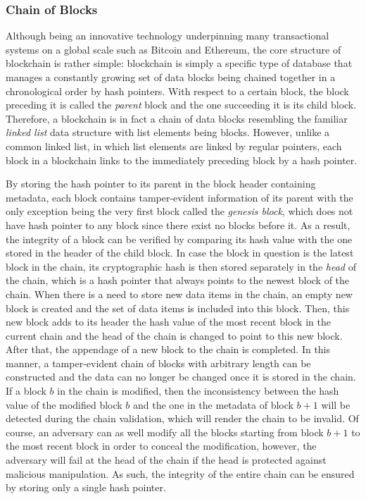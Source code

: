 \subsubsection{Chain of Blocks}\label{sec_chain_of_blocks}

Although being an innovative technology underpinning many transactional systems on a global scale such as Bitcoin and Ethereum, the core structure of blockchain is rather simple: blockchain is simply a specific type of database that manages a constantly growing set of data blocks being chained together in a chronological order by hash pointers. With respect to a certain block, the block preceding it is called the \textit{parent} block and the one succeeding it is its child block. Therefore, a blockchain is in fact a chain of data blocks resembling the familiar \textit{linked list} data structure with list elements being blocks. However, unlike a common linked list, in which list elements are linked by regular pointers, each block in a blockchain links to the immediately preceding block by a hash pointer.

By storing the hash pointer to its parent in the block header containing metadata, each block contains tamper-evident information of its parent with the only exception being the very first block called the \textit{genesis block}, which does not have hash pointer to any block since there exist no blocks before it. As a result, the integrity of a block can be verified by comparing its hash value with the one stored in the header of the child block. In case the block in question is the latest block in the chain, its cryptographic hash is then stored separately in the \textit{head} of the chain, which is a hash pointer that always points to the newest block of the chain. When there is a need to store new data items in the chain, an empty new block is created and the set of data items is included into this block. Then, this new block adds to its header the hash value of the most recent block in the current chain and the head of the chain is changed to point to this new block. After that, the appendage of a new block to the chain is completed. In this manner, a tamper-evident chain of blocks with arbitrary length can be constructed and the data can no longer be changed once it is stored in the chain. If a block $b$ in the chain is modified, then the inconsistency between the hash value of the modified block $b$ and the one in the metadata of block $b+1$ will be detected during the chain validation, which will render the chain to be invalid. Of course, an adversary can as well modify all the blocks starting from block $b+1$ to the most recent block in order to conceal the modification, however, the adversary will fail at the head of the chain if the head is protected against malicious manipulation. As such, the integrity of the entire chain can be ensured by storing only a single hash pointer. 

